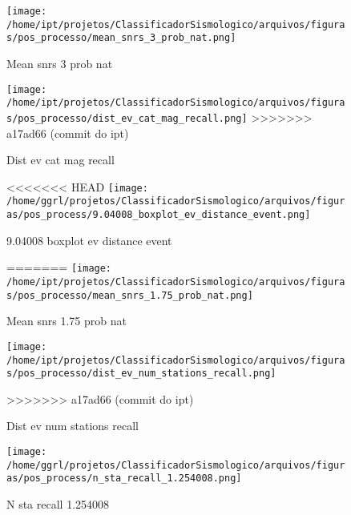                     \begin{figure}[H]
                        \centering
                        \texttt{[image: /home/ipt/projetos/ClassificadorSismologico/arquivos/figuras/pos\_processo/mean\_snrs\_3\_prob\_nat.png]}
                        \caption{Mean snrs 3 prob nat}
                        \label{fig:mean_snrs_3_prob_nat}
                    \end{figure}
                

                    \begin{figure}[H]
                        \centering
                        \texttt{[image: /home/ipt/projetos/ClassificadorSismologico/arquivos/figuras/pos\_processo/dist\_ev\_cat\_mag\_recall.png]}
>>>>>>> a17ad66 (commit do ipt)
                        \caption{Dist ev cat mag recall}
                        \label{fig:dist_ev_cat_mag_recall}
                    \end{figure}
                

                    \begin{figure}[H]
                        \centering
<<<<<<< HEAD
                        \texttt{[image: /home/ggrl/projetos/ClassificadorSismologico/arquivos/figuras/pos\_process/9.04008\_boxplot\_ev\_distance\_event.png]}
                        \caption{9.04008 boxplot ev distance event}
                        \label{fig:9.04008_boxplot_ev_distance_event}
=======
                        \texttt{[image: /home/ipt/projetos/ClassificadorSismologico/arquivos/figuras/pos\_processo/mean\_snrs\_1.75\_prob\_nat.png]}
                        \caption{Mean snrs 1.75 prob nat}
                        \label{fig:mean_snrs_1.75_prob_nat}
                    \end{figure}
                

                    \begin{figure}[H]
                        \centering
                        \texttt{[image: /home/ipt/projetos/ClassificadorSismologico/arquivos/figuras/pos\_processo/dist\_ev\_num\_stations\_recall.png]}
                        \caption{Dist ev num stations recall}
                        \label{fig:dist_ev_num_stations_recall}
>>>>>>> a17ad66 (commit do ipt)
                    \end{figure}
                

                    \begin{figure}[H]
                        \centering
                        \texttt{[image: /home/ggrl/projetos/ClassificadorSismologico/arquivos/figuras/pos\_process/n\_sta\_recall\_1.254008.png]}
                        \caption{N sta recall 1.254008}
                        \label{fig:n_sta_recall_1.254008}
                    \end{figure}
                

